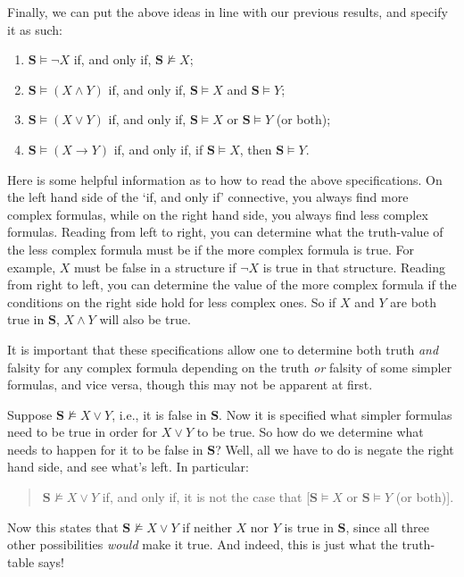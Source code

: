 Finally, we can put the above ideas in line with our previous results, and specify it as such:

\begin{enumerate}
	\item $\mathbf{S} \models \neg X$ if, and only if, $\mathbf{S} \not\models X$;
	\item $\mathbf{S} \models (X \wedge Y)$ if, and only if, $\mathbf{S} \models X$ and $\mathbf{S}\models Y$;
	\item $\mathbf{S} \models (X \vee Y)$ if, and only if, $\mathbf{S} \models X$ or $\mathbf{S}\models Y$ (or both);
	\item $\mathbf{S} \models (X \rightarrow Y)$ if, and only if, if $\mathbf{S} \models X$, then $\mathbf{S} \models Y$. 
\end{enumerate}

Here is some helpful information as to how to read the above specifications. On the left hand side of the `if, and only if' connective, you always find more complex formulas, while on the right hand side, you always find less complex formulas. Reading from left to right, you can determine what the truth-value of the less complex formula must be if the more complex formula is true. For example, $X$ must be false in a structure if $\neg X$ is true in that structure. Reading from right to left, you can determine the value of the more complex formula if the conditions on the right side hold for less complex ones. So if $X$ and $Y$ are both true in $\mathbf{S}$, $X \wedge Y$ will also be true. 

It is important that these specifications allow one to determine both truth \textit{and} falsity for any complex formula depending on the truth \textit{or} falsity of some simpler formulas, and vice versa, though this may not be apparent at first. 

Suppose $\mathbf{S} \not\models X \vee Y$, i.e., it is false in $\mathbf{S}$. Now it is specified what simpler formulas need to be true in order for $X \vee Y$ to be true. So how do we determine what needs to happen for it to be false in $\mathbf{S}$? Well, all we have to do is negate the right hand side, and see what's left. In particular:
%
\begin{quote}
	$\mathbf{S} \not\models X \vee Y$ if, and only if, it is not the case that [$\mathbf{S} \models X$ or $\mathbf{S}\models Y$ (or both)].
\end{quote}
%
Now this states that $\mathbf{S} \not\models X \vee Y$ if neither $X$ nor $Y$ is true in $\mathbf{S}$, since all three other possibilities \textit{would} make it true. And indeed, this is just what the truth-table says!

